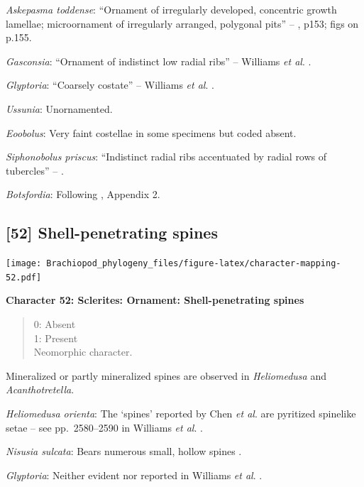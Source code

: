 \documentclass[]{book}
\theoremstyle{definition}
\theoremstyle{definition}
\theoremstyle{definition}
\theoremstyle{remark}
\begin{document}
\emph{Askepasma toddense}: ``Ornament of irregularly developed,
concentric growth lamellae; microornament of irregularly arranged,
polygonal pits'' -- \citet{Williams2000BrachiopodaLinguliformea}, p153;
figs on p.155.

\emph{Gasconsia}: ``Ornament of indistinct low radial ribs'' -- Williams
\emph{et al}. \citeyearpar[p167]{Williams2000BrachiopodaLinguliformea}.

\emph{Glyptoria}: ``Coarsely costate'' -- Williams \emph{et al}.
\citeyearpar[p710]{Williams2000BrachiopodaLinguliformea}.

\emph{Ussunia}: Unornamented.

\emph{Eoobolus}: Very faint costellae in some specimens but coded
absent.

\emph{Siphonobolus priscus}: ``Indistinct radial ribs accentuated by
radial rows of tubercles'' -- \citet{Popov2009Earlyontogeny}.

\emph{Botsfordia}: Following \citet{Williams1998Thediversity}, Appendix
2.

\hypertarget{shell-penetrating-spines}{%
\subsection*{{[}52{]} Shell-penetrating
spines}\label{shell-penetrating-spines}}

\texttt{[image: Brachiopod\_phylogeny\_files/figure-latex/character-mapping-52.pdf]}

\textbf{Character 52: Sclerites: Ornament: Shell-penetrating spines}

\begin{quote}
0: Absent\\
1: Present\\
Neomorphic character.
\end{quote}

Mineralized or partly mineralized spines are observed in
\emph{Heliomedusa} and \emph{Acanthotretella}.

\emph{Heliomedusa orienta}: The `spines' reported by Chen \emph{et al}.
\citeyearpar{Chen2007Reinterpretationof} are pyritized spinelike\\
setae -- see pp.~2580--2590 in Williams \emph{et al}.
\citeyearpar{Williams2007PartH}.

\emph{Nisusia sulcata}: Bears numerous small, hollow spines
\citep{Williams2000BrachiopodaLinguliformea}.

\emph{Glyptoria}: Neither evident nor reported in Williams \emph{et al}.
\citeyearpar{Williams2000BrachiopodaLinguliformea}.
\end{document}
